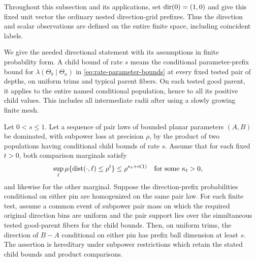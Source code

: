 Throughout this subsection and its applications, set $\operatorname{dir}(0)=(1,0)$
and give this fixed unit vector the ordinary nested direction-grid
prefixes.  Thus the direction and scalar observations are defined on
the entire finite space, including coincident labels.

We give the needed directional statement with its assumptions in
finite probability form. A child bound of rate $s$ means the conditional parameter-prefix
bound for $\lambda(\Theta_b\mid\Theta_a)$ in
\eqref{eq:rate-parameter-bounds} at every fixed tested pair of depths,
on uniform trims and typical parent fibers.  On each tested good parent,
it applies to the entire named conditional population, hence to all its
positive child values.  This includes
all intermediate radii after using a slowly growing finite mesh.

\begin{proposition}\label{prop:directional-bootstrap}
Let $0<s\le1$. Let a sequence of pair laws of bounded planar
parameters $(A,B)$ be dominated, with subpower loss at precision
$\rho$, by the product of two populations having conditional child
bounds of rate $s$.  Assume that for each fixed $t>0$, both comparison
marginals satisfy
\begin{equation}\label{eq:rate-no-strip}
 \sup_{\ell}\mu\{\operatorname{dist}(\cdot,\ell)\le\rho^t\}
       \le\rho^{\kappa_t+o(1)}\quad\text{for some }\kappa_t>0,
\end{equation}
and likewise for the other marginal. Suppose the direction-prefix
probabilities conditional on either pin are homogenized on the same
pair law.  For each finite test, assume a common event of subpower pair
mass on which the required original direction bins are uniform and the
pair support lies over the simultaneous tested good-parent fibers for
the child bounds.  Then, on uniform trims, the direction of $B-A$ conditional
on either pin has prefix ball dimension at least $s$.
The assertion is hereditary under subpower restrictions which retain
the stated child bounds and product comparisons.
\end{proposition}

